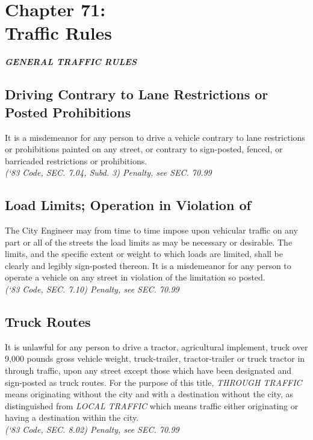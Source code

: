 \chapter*{Chapter 71: \\
	Traffic Rules}
    \minitoc
    \pagebreak

\begin{center}
\emph{\textbf{\LARGE{GENERAL TRAFFIC RULES}}}
\end{center}

\section{Driving Contrary to Lane Restrictions or Posted Prohibitions}
It is a misdemeanor for any person to drive a vehicle contrary to lane restrictions or prohibitions painted on any street, or contrary to sign-posted, fenced, or barricaded restrictions or prohibitions.\\
\emph{(‘83 Code, SEC. 7.04, Subd. 3) Penalty, see SEC. 70.99}
\section{Load Limits; Operation in Violation of}
The City Engineer may from time to time impose upon vehicular traffic on any part or all of the streets the load limits as may be necessary or desirable. The limits, and the specific extent or weight to which loads are limited, shall be clearly and legibly sign-posted thereon. It is a misdemeanor for any person to operate a vehicle on any street in violation of the limitation so posted.\\
\emph{(‘83 Code, SEC. 7.10) Penalty, see SEC. 70.99}
\section{Truck Routes}
It is unlawful for any person to drive a tractor, agricultural implement, truck over 9,000 pounds gross vehicle weight, truck-trailer, tractor-trailer or truck tractor in through traffic, upon any street except those which have been designated and sign-posted as truck routes.  For the purpose of this title, \emph{THROUGH TRAFFIC} means originating without the city and with a destination without the city, as distinguished from \emph{LOCAL TRAFFIC} which means traffic either originating or having a destination within the city.\\
\emph{(‘83 Code, SEC. 8.02) Penalty, see SEC. 70.99}

